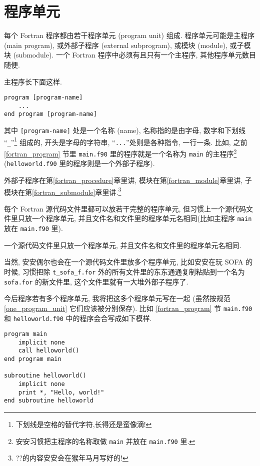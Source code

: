 \section{程序单元}\label{program_unit}

每个 Fortran 程序都由若干程序单元 (program unit) 组成. 程序单元可能是主程序 (main program), 或外部子程序 (external subprogram), 或模块 (module), 或子模块 (submodule). 一个 Fortran 程序中必须有且只有一个主程序, 其他程序单元数目随便.

主程序长下面这样.
\begin{lstlisting}
program [program-name]
    ...
end program [program-name]
\end{lstlisting}
其中 \texttt{[program-name]} 处是一个名称 (name), 名称指的是由字母, 数字和下划线 ``\texttt{\_{}}''\footnote{
    下划线是空格的替代字符,长得还是蛮像滴!
} 组成的, 开头是字母的字符串, ``\texttt{...}''处则是各种指令, 一行一条. 比如, 之前 \ref{fortran_program} 节里 \texttt{main.f90} 里的程序就是一个名称为 \texttt{main} 的主程序\footnote{安安习惯把主程序的名称取做 \texttt{main} 并放在 \texttt{main.f90} 里.} \\(\texttt{helloworld.f90} 里的程序则是一个外部子程序).

外部子程序在第\ref{fortran_procedure}章里讲, 模块在第\ref{fortran_module}章里讲, 子模块在第\ref{fortran_submodule}章里讲.\footnote{??\mbox{}的内容安安会在猴年马月写好的!}

每个 Fortran 源代码文件里都可以放若干完整的程序单元, 但习惯上一个源代码文件里只放一个程序单元, 并且文件名和文件里的程序单元名相同(比如主程序 \texttt{main} 放在 \texttt{main.f90} 里).
\begin{convention}
    一个源代码文件里只放一个程序单元, 并且文件名和文件里的程序单元名相同.\label{one_program_unit}
\end{convention}
当然, 安安偶尔也会在一个源代码文件里放多个程序单元, 比如安安在玩 SOFA 的时候, 习惯把除 \texttt{t\_{}sofa\_{}f.for} 外的所有文件里的东东通通复制粘贴到一个名为 \texttt{sofa.for} 的新文件里, 这个文件里就有一大堆外部子程序了.

今后程序若有多个程序单元, 我将把这多个程序单元写在一起 (虽然按规范 \ref{one_program_unit} 它们应该被分别保存). 比如 \ref{fortran_program} 节 \texttt{main.f90} 和 \texttt{helloworld.f90} 中的程序会合写成如下模样.
\begin{lstlisting}
program main
    implicit none
    call helloworld()
end program main

subroutine helloworld()
    implicit none
    print *, "Hello, world!"
end subroutine helloworld
\end{lstlisting}

